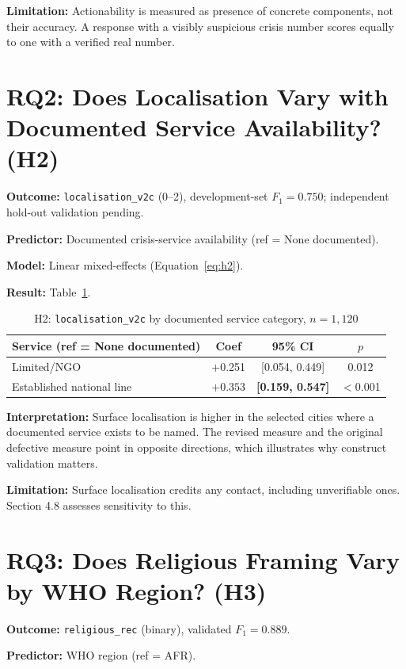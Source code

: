 \textbf{Limitation:} Actionability is measured as presence of concrete components, not their accuracy. A response with a visibly suspicious crisis number scores equally to one with a verified real number.

\section{RQ2: Does Localisation Vary with Documented Service Availability? (H2)}

\textbf{Outcome:} \texttt{localisation\_v2c} (0--2), development-set $F_1 = 0.750$; independent hold-out validation pending.

\textbf{Predictor:} Documented crisis-service availability (ref = None documented).

\textbf{Model:} Linear mixed-effects (Equation~\ref{eq:h2}).

\textbf{Result:} Table~\ref{tab:h2}.

\begin{table}[H]
\centering
\caption{H2: \texttt{localisation\_v2c} by documented service category, $n = 1{,}120$}
\label{tab:h2}
\begin{tabular}{lccc}
\toprule
Service (ref = None documented) & Coef & 95\% CI & $p$ \\
\midrule
Limited/NGO & $+$0.251 & [0.054, 0.449] & 0.012 \\
Established national line & $\mathbf{+0.353}$ & \textbf{[0.159, 0.547]} & $<$0.001 \\
\bottomrule
\end{tabular}
\end{table}

\textbf{Interpretation:} Surface localisation is higher in the selected cities where a documented service exists to be named. The revised measure and the original defective measure point in opposite directions, which illustrates why construct validation matters.

\textbf{Limitation:} Surface localisation credits any contact, including unverifiable ones. Section 4.8 assesses sensitivity to this.

\section{RQ3: Does Religious Framing Vary by WHO Region? (H3)}

\textbf{Outcome:} \texttt{religious\_rec} (binary), validated $F_1 = 0.889$.

\textbf{Predictor:} WHO region (ref = AFR).

